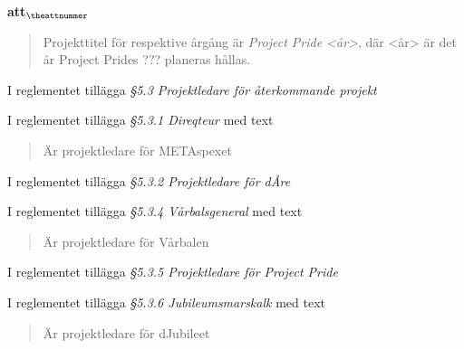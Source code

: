 \documentclass[a4paper]{article}
\begin{document}
\begin{list}{\bf att$_{\theattnummer}$}{}
\begin{quote}
        Projekttitel för respektive årgång är \textit{Project Pride <år>}, där <år> är det år Project Prides ??? planeras hållas.
    \end{quote}

%


\item I reglementet tillägga \textit{\S5.3 Projektledare för återkommande projekt}
\item I reglementet tillägga \textit{\S5.3.1 Direqteur} med text \begin{quote} Är projektledare för METAspexet \end{quote}
\item I reglementet tillägga \textit{\S5.3.2 Projektledare för dÅre}
\item I reglementet tillägga \textit{\S5.3.4 Vårbalsgeneral} med text \begin{quote} Är projektledare för Vårbalen \end{quote}
\item I reglementet tillägga \textit{\S5.3.5 Projektledare för Project Pride}
\item I reglementet tillägga \textit{\S5.3.6 Jubileumsmarskalk} med text \begin{quote} Är projektledare för dJubileet \end{quote}


\end{list}
\end{document}
